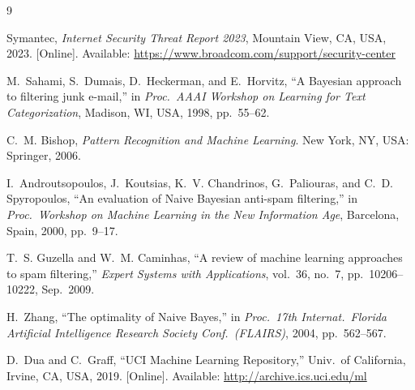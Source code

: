 \documentclass[conference,letterpaper]{IEEEtran}
\begin{document}
\begin{thebibliography}{9}

Symantec, \emph{Internet Security Threat Report 2023}, Mountain View, CA, USA, 2023.
[Online]. Available: \url{https://www.broadcom.com/support/security-center}

M.~Sahami, S.~Dumais, D.~Heckerman, and E.~Horvitz, ``A Bayesian approach to filtering
junk e-mail,'' in \emph{Proc.\ AAAI Workshop on Learning for Text Categorization},
Madison, WI, USA, 1998, pp.~55--62.

C.~M. Bishop, \emph{Pattern Recognition and Machine Learning}.
New York, NY, USA: Springer, 2006.

I.~Androutsopoulos, J.~Koutsias, K.~V. Chandrinos, G.~Paliouras, and C.~D. Spyropoulos,
``An evaluation of Naive Bayesian anti-spam filtering,'' in \emph{Proc.\ Workshop on
Machine Learning in the New Information Age}, Barcelona, Spain, 2000, pp.~9--17.

T.~S. Guzella and W.~M. Caminhas, ``A review of machine learning approaches to spam
filtering,'' \emph{Expert Systems with Applications}, vol.~36, no.~7,
pp.~10206--10222, Sep.\ 2009.

H.~Zhang, ``The optimality of Naive Bayes,'' in \emph{Proc.\ 17th Internat.\ Florida
Artificial Intelligence Research Society Conf.\ (FLAIRS)}, 2004, pp.~562--567.

D.~Dua and C.~Graff, ``UCI Machine Learning Repository,'' Univ.\ of California,
Irvine, CA, USA, 2019. [Online]. Available: \url{http://archive.ics.uci.edu/ml}

\end{thebibliography}

\balance
\end{document}
